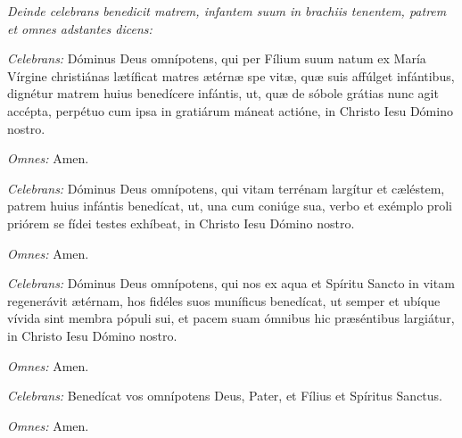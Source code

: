 
\textit{Deinde celebrans benedicit matrem, infantem suum in brachiis
tenentem, patrem et omnes adstantes dicens:}

\textit{Celebrans:} Dóminus Deus omnípotens, qui per Fílium suum natum ex María Vírgine christiánas
lætíficat matres ætérnæ spe vitæ, quæ suis affúlget infántibus, dignétur matrem huius
benedícere infántis, ut, quæ de sóbole grátias nunc agit accépta, perpétuo cum ipsa
in gratiárum máneat actióne, in Christo Iesu Dómino nostro.

\textit{Omnes:} Amen.

\textit{Celebrans:} Dóminus Deus omnípotens, qui vitam terrénam largítur et cæléstem, patrem huius infántis
benedícat, ut, una cum coniúge sua, verbo et exémplo proli priórem se fídei testes exhíbeat,
in Christo Iesu Dómino nostro.

\textit{Omnes:} Amen.

\textit{Celebrans:} Dóminus Deus omnípotens, qui nos ex aqua et Spíritu Sancto in vitam regenerávit
ætérnam, hos fidéles suos muníficus benedícat, ut semper et ubíque vívida sint membra pópuli sui,
et pacem suam ómnibus hic præséntibus largiátur, in Christo Iesu Dómino nostro.

\textit{Omnes:} Amen.

\textit{Celebrans:} Benedícat vos omnípotens Deus,
Pater, et Fílius \grecross{} et Spíritus Sanctus.

\textit{Omnes:} Amen.
